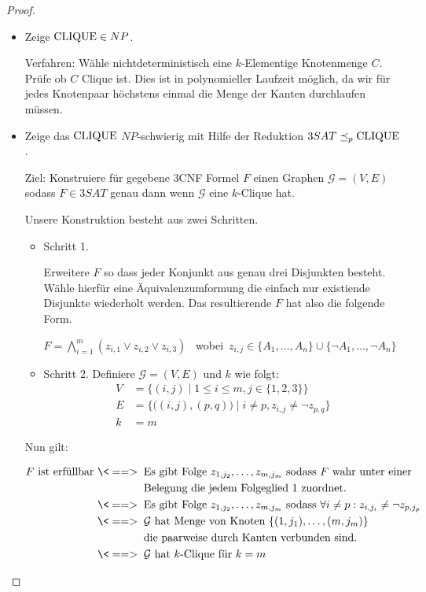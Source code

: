 \begin{proof}
    \begin{itemize}
     \item Zeige $\operatorname{CLIQUE}\in NP$.
     
     Verfahren: 
     Wähle nichtdeterministisch eine $k$-Elementige Knotenmenge $C$.
     Prüfe ob $C$ Clique ist.
     Dies ist in polynomieller Laufzeit möglich, da wir für jedes Knotenpaar höchstens einmal die Menge der Kanten durchlaufen müssen.
     
     \item Zeige das $\operatorname{CLIQUE}$ $NP$-schwierig mit Hilfe der Reduktion  $3SAT \preceq_p \operatorname{CLIQUE}$.
     
     Ziel: Konstruiere für gegebene 3CNF Formel $F$ einen Graphen $\mathcal{G}=(V,E)$ sodass $F\in 3SAT$ genau dann wenn $\mathcal{G}$ eine $k$-Clique hat.
     
     Unsere Konstruktion besteht aus zwei Schritten.
     
     \begin{itemize}
      \item Schritt 1.
      
      Erweitere $F$ so dass jeder Konjunkt aus genau drei Disjunkten besteht.
      Wähle hierfür eine Äquivalenzumformung die einfach nur existiende Disjunkte wiederholt werden.
      Das resultierende $F$ hat also die folgende Form.
      
      $F = \bigwedge\limits_{i=1}^m (z_{i,1}\lor z_{i,2}\lor z_{i,3})$ \ wobei\ $z_{i,j}\in \{A_1,\dots,A_n\}\cup\{\neg A_1,\dots,\neg A_n\}$
      \item Schritt 2.
      	Definiere $\mathcal{G} = (V,E)$ und $k$ wie folgt:
	\begin{align*}
		V &= \{ (i,j) \mid 1\leq i\leq m, j\in\{1,2,3\} \}\\
		E &= \{\big((i,j),(p,q)\big) \mid i\neq p, z_{i,j}\neq\neg z_{p,q}\}\\
		k &= m
	\end{align*}
     \end{itemize}

    Nun gilt:
    
    \begin{align*}
    F \text{ ist erfüllbar } \<==> \;\; & \text{Es gibt Folge $z_{1,j_2},\dots,z_{m,j_m}$ sodass $F$ wahr unter einer}\\
    & \text{Belegung die jedem Folgeglied $1$ zuordnet.}\\
    \<==> \;\;   & \text{Es gibt Folge $z_{1,j_2},\dots,z_{m,j_m}$ sodass $\forall i\neq p: z_{i,j_i}\neq \neg z_{p,j_p}$}\\
    \<==> \;\;   & \text{$\mathcal{G}$ hat Menge von Knoten $\{(1,j_1),\dots,(m,j_m)\}$}\\
    & \text{die paarweise durch Kanten verbunden sind.}\\
    \<==> \;\;   & \text{$\mathcal{G}$ hat $k$-Clique für $k=m$}\\
    \end{align*}
    

\end{itemize}
\end{proof}
